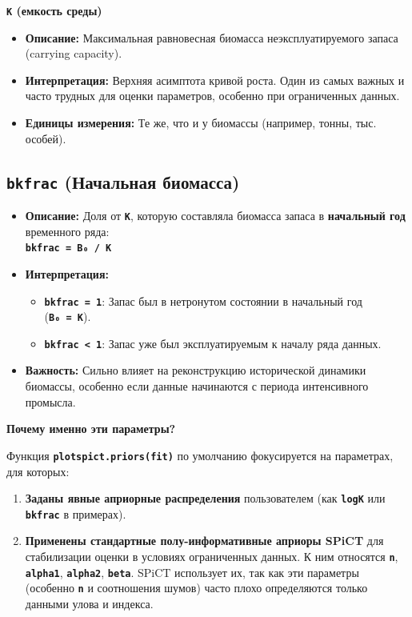 \documentclass[
  letterpaper,
  DIV=11,
  numbers=noendperiod]{scrreprt}
\begin{document}
\textbf{\texttt{K} (емкость среды)}

\begin{itemize}
\item
  \textbf{Описание:} Максимальная равновесная биомасса
  неэксплуатируемого запаса (carrying capacity).
\item
  \textbf{Интерпретация:} Верхняя асимптота кривой роста. Один из самых
  важных и часто трудных для оценки параметров, особенно при
  ограниченных данных.
\item
  \textbf{Единицы измерения:} Те же, что и у биомассы (например, тонны,
  тыс. особей).
\end{itemize}

\subsection{\texorpdfstring{\textbf{\texttt{bkfrac} (Начальная
биомасса)}}{bkfrac (Начальная биомасса)}}\label{bkfrac-ux43dux430ux447ux430ux43bux44cux43dux430ux44f-ux431ux438ux43eux43cux430ux441ux441ux430}

\begin{itemize}
\item
  \textbf{Описание:} Доля от \textbf{\texttt{K}}, которую составляла
  биомасса запаса в \textbf{начальный год} временного ряда:\\
  \textbf{\texttt{bkfrac\ =\ B₀\ /\ K}}
\item
  \textbf{Интерпретация:}

  \begin{itemize}
  \item
    \textbf{\texttt{bkfrac\ =\ 1}}: Запас был в нетронутом состоянии в
    начальный год (\textbf{\texttt{B₀\ =\ K}}).
  \item
    \textbf{\texttt{bkfrac\ \textless{}\ 1}}: Запас уже был
    эксплуатируемым к началу ряда данных.
  \end{itemize}
\item
  \textbf{Важность:} Сильно влияет на реконструкцию исторической
  динамики биомассы, особенно если данные начинаются с периода
  интенсивного промысла.
\end{itemize}

\textbf{Почему именно эти параметры?}

Функция \textbf{\texttt{plotspict.priors(fit)}} по умолчанию
фокусируется на параметрах, для которых:

\begin{enumerate}
\def\labelenumi{\arabic{enumi}.}
\item
  \textbf{Заданы явные априорные распределения} пользователем (как
  \textbf{\texttt{logK}} или \textbf{\texttt{bkfrac}} в примерах).
\item
  \textbf{Применены стандартные полу-информативные априоры SPiCT} для
  стабилизации оценки в условиях ограниченных данных. К ним относятся
  \textbf{\texttt{n}}, \textbf{\texttt{alpha1}},
  \textbf{\texttt{alpha2}}, \textbf{\texttt{beta}}. SPiCT использует их,
  так как эти параметры (особенно \textbf{\texttt{n}} и соотношения
  шумов) часто плохо определяются только данными улова и индекса.
\end{enumerate}
\end{document}
